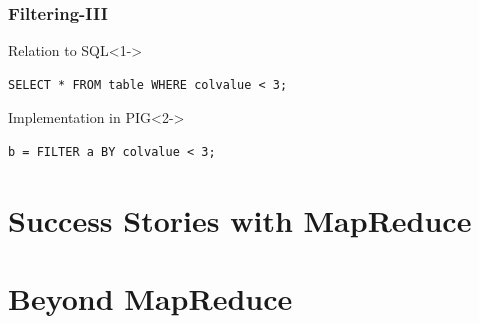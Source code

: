 \documentclass[xcolor=dvipsnames,dvip,notes=show,table]{beamer}
\begin{document}
\begin{frame}[fragile]
  \frametitle{Filtering-III}
  \begin{block}{Relation to SQL}<1->
  
  \begin{lstlisting}
SELECT * FROM table WHERE colvalue < 3;
\end{lstlisting}
\end{block}

\begin{exampleblock}{Implementation in PIG}<2->

\begin{lstlisting}
b = FILTER a BY colvalue < 3;
\end{lstlisting}

\end{exampleblock}

\end{frame}







\section{Success Stories with MapReduce}



\section{Beyond MapReduce}


\end{document}
